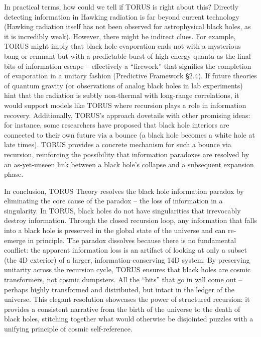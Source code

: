\documentclass[]{article}
\begin{document}
In practical terms, how could we tell if TORUS is right about this?
Directly detecting information in Hawking radiation is far beyond
current technology (Hawking radiation itself has not been observed for
astrophysical black holes, as it is incredibly weak). However, there
might be indirect clues. For example, TORUS might imply that black hole
evaporation ends not with a mysterious bang or remnant but with a
predictable burst of high-energy quanta as the final bits of information
escape -- effectively a ``firework'' that signifies the completion of
evaporation in a unitary fashion (Predictive Framework §2.4). If future
theories of quantum gravity (or observations of analog black holes in
lab experiments) hint that the radiation is subtly non-thermal with
long-range correlations, it would support models like TORUS where
recursion plays a role in information recovery. Additionally, TORUS's
approach dovetails with other promising ideas: for instance, some
researchers have proposed that black hole interiors are connected to
their own future via a bounce (a black hole becomes a white hole at late
times). TORUS provides a concrete mechanism for such a bounce via
recursion, reinforcing the possibility that information paradoxes are
resolved by an as-yet-unseen link between a black hole's collapse and a
subsequent expansion phase.

In conclusion, TORUS Theory resolves the black hole information paradox
by eliminating the core cause of the paradox -- the loss of information
in a singularity. In TORUS, black holes do not have singularities that
irrevocably destroy information. Through the closed recursion loop, any
information that falls into a black hole is preserved in the global
state of the universe and can re-emerge in principle. The paradox
dissolves because there is no fundamental conflict: the apparent
information loss is an artifact of looking at only a subset (the 4D
exterior) of a larger, information-conserving 14D system. By preserving
unitarity across the recursion cycle, TORUS ensures that black holes are
cosmic transformers, not cosmic dumpsters. All the ``bits'' that go in
will come out -- perhaps highly transformed and distributed, but intact
in the ledger of the universe. This elegant resolution showcases the
power of structured recursion: it provides a consistent narrative from
the birth of the universe to the death of black holes, stitching
together what would otherwise be disjointed puzzles with a unifying
principle of cosmic self-reference.
\end{document}
